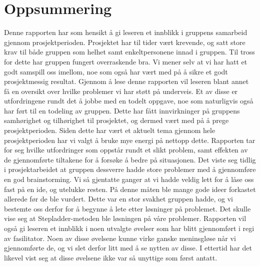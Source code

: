 \section*{\centering Oppsummering}
Denne rapporten har som hensikt å gi leseren et innblikk i gruppens samarbeid gjennom prosjektperioden. Prosjektet har til tider vært krevende, og satt store krav til både gruppen som helhet samt enkeltpersonene innad i gruppen. Til tross for dette har gruppen fungert overraskende bra. Vi mener selv at vi har hatt et godt samspill oss imellom, noe som også har vært med på å sikre et godt prosjektmessig resultat.\newline
Gjennom å lese denne rapporten vil leseren blant annet få en oversikt over hvilke problemer vi har støtt på underveis. Et av disse er utfordringene rundt det å jobbe med en todelt oppgave, noe som naturligvis også har ført til en todeling av gruppen. Dette har fått innvirkninger på gruppens samhørighet og tilhørighet til prosjektet, og dermed vært med på å prege prosjektperioden. Siden dette har vært et aktuelt tema gjennom hele prosjektperioden har vi valgt å bruke mye energi på nettopp dette. Rapporten tar for seg hvilke utfordringer som oppstår rundt et slikt problem, samt effekten av de gjennomførte tiltakene for å forsøke å bedre på situasjonen.\newline
Det viste seg tidlig i prosjektarbeidet at gruppen dessverre hadde store problemer med å gjennomføre en god brainstorming. Vi så gjentatte ganger at vi hadde veldig lett for å låse oss fast på en ide, og utelukke resten. På denne måten ble mange gode ideer forkastet allerede før de ble vurdert. Dette var en stor svakhet gruppen hadde, og vi bestemte oss derfor for å begynne å lete etter løsninger på problemet. Det skulle vise seg at Stepladder-metoden ble løsningen på våre problemer.\newline
Rapporten vil også gi leseren et innblikk i noen utvalgte øvelser som har blitt gjennomført i regi av fasilitator. Noen av disse øvelsene kunne virke ganske meninsgløse når vi gjennomførte de, og vi slet derfor litt med å se nytten av disse. I ettertid har det likevel vist seg at disse øvelsene ikke var så unyttige som først antatt.



